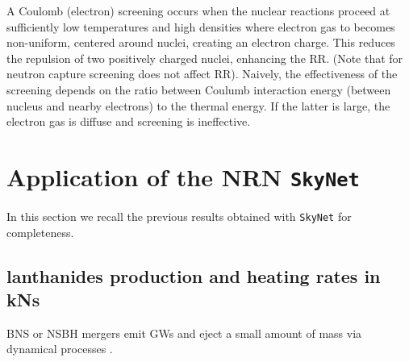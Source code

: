 A Coulomb (electron) screening occurs when the nuclear reactions proceed at sufficiently low temperatures and high densities where electron gas to becomes non-uniform, centered around nuclei, creating an electron charge. This reduces the repulsion of two positively charged nuclei, enhancing the \ac{RR}. (Note that for neutron capture screening does not affect \ac{RR}).
Naively, the effectiveness of the screening depends on the ratio between Coulumb interaction energy (between nucleus and nearby electrons) to the thermal energy. If the latter is large, the electron gas is diffuse and screening is ineffective.






\section{Application of the \ac{NRN} \texttt{SkyNet}}

In this section we recall the previous results obtained with \texttt{SkyNet} for completeness.

\subsection{\rproc{} lanthanides production and heating rates in \acp{kN}}

\ac{BNS} or \ac{NSBH} mergers emit \acp{GW} \citep{TheLIGOScientific:2014jea} and eject a small amount of mass via dynamical processes \citep{Lattimer:1977}. 



